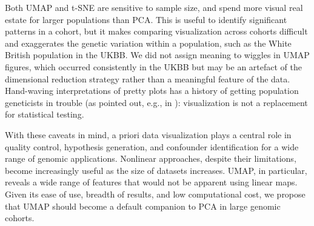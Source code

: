 \documentclass[12pt]{pnas-new}
\begin{document}
Both UMAP and t-SNE are sensitive to sample size, and spend more visual real estate for larger populations than PCA. This is useful to identify significant patterns in a cohort, but it makes comparing visualization across cohorts difficult and exaggerates the genetic variation within a population, such as the White British population in the UKBB. We did not assign meaning to wiggles in UMAP figures, which occurred consistently in the UKBB but may be an artefact of the dimensional reduction strategy rather than a meaningful feature of the data. Hand-waving interpretations of pretty plots has a history of getting population geneticists in trouble (as pointed out, e.g., in \cite{novembre2008interpreting}): visualization is not a replacement for statistical testing.       

With these caveats in mind, a priori data visualization plays a central role in quality control, hypothesis generation, and confounder identification for a wide range of genomic applications. Nonlinear approaches, despite their limitations, become increasingly useful as the size of datasets increases. UMAP, in particular, reveals a wide range of features that would not be apparent using linear maps. Given its ease of use, breadth of results, and low computational cost, we propose that UMAP should become a default companion to PCA in large genomic cohorts.
\end{document}
